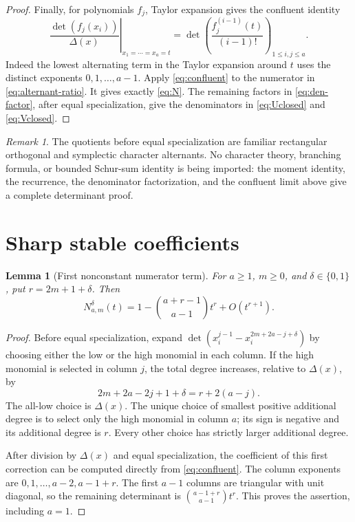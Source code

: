 \documentclass[11pt]{article}
\newtheorem{lemma}[theorem]{Lemma}
\theoremstyle{definition}
\theoremstyle{remark}
\newtheorem{remark}[theorem]{Remark}
\newcommand{\Dlt}{\Delta}
\numberwithin{equation}{section}
\begin{document}
\begin{proof}
Finally, for polynomials $f_j$, Taylor expansion gives the confluent identity
\begin{equation}
 \left.\frac{\det(f_j(x_i))}{\Dlt(x)}\right|_{x_1=\cdots=x_a=t}
 =\det\left(\frac{f_j^{(i-1)}(t)}{(i-1)!}\right)_{1\le i,j\le a}.
 \label{eq:confluent}
\end{equation}
Indeed the lowest alternating term in the Taylor expansion around $t$ uses
the distinct exponents $0,1,\ldots,a-1$.
Apply \eqref{eq:confluent} to the numerator in
\eqref{eq:alternant-ratio}. It gives exactly \eqref{eq:N}.
The remaining factors in \eqref{eq:den-factor}, after equal specialization,
give the denominators in \eqref{eq:Uclosed} and \eqref{eq:Vclosed}.
\end{proof}

\begin{remark}
The quotients before equal specialization are familiar rectangular
orthogonal and symplectic character alternants. No character theory,
branching formula, or bounded Schur-sum identity is being imported: the
moment identity, the recurrence, the denominator factorization, and the
confluent limit above give a complete determinant proof.
\end{remark}

\section{Sharp stable coefficients}
\label{sec:stable}

\begin{lemma}[First nonconstant numerator term]
\label{lem:first-term}
For $a\ge1$, $m\ge0$, and $\delta\in\{0,1\}$, put
$r=2m+1+\delta$. Then
\begin{equation}
 N^\delta_{a,m}(t)=1-\binom{a+r-1}{a-1}t^r+O(t^{r+1}).
 \label{eq:N-first}
\end{equation}
\end{lemma}
\begin{proof}
Before equal specialization, expand
$\det(x_i^{j-1}-x_i^{2m+2a-j+\delta})$ by choosing either the low or the
high monomial in each column. If the high monomial is selected in column
$j$, the total degree increases, relative to $\Dlt(x)$, by
\[
 2m+2a-2j+1+\delta=r+2(a-j).
\]
The all-low choice is $\Dlt(x)$. The unique choice of smallest positive
additional degree is to select only the high monomial in column $a$;
its sign is negative and its additional degree is $r$.
Every other choice has strictly larger additional degree.

After division by $\Dlt(x)$ and equal specialization, the coefficient of
this first correction can be computed directly from
\eqref{eq:confluent}. The column exponents are
$0,1,\ldots,a-2,a-1+r$. The first $a-1$ columns are triangular with
unit diagonal, so the remaining determinant is
$\binom{a-1+r}{a-1}t^r$. This proves the assertion, including $a=1$.
\end{proof}
\end{document}
